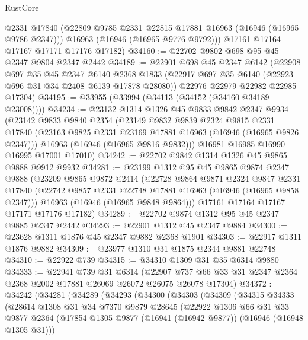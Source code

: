 \begin{lexlean}{RustCore}
\begin{coremodule}
        @2331
        @17840
        (@22809 @9785 @2331 @22815 @17881 @16963 (@16946 (@16965 @9786 @2347)))
        @16963
        (@16946 (@16965 @9776 @9792)))
      @17161
      @17164
      @17167
      @17171
      @17176
      @17182)
@34160 := @22702 @9802 @698 @95 @45 @2347 @9804 @2347 @2442
@34189 := @22901
    @698
    @45
    @2347
    @6142
    (@22908
      @697
      @35
      @45
      @2347
      @6140
      @2368
      @1833
      (@22917 @697 @35 @6140 (@22923 @696 @31 @34 @2408 @6139 @17878 @28080))
      @22976
      @22979
      @22982
      @22985
      @17304)
@34195 := @33955 (@33994 (@34113 (@34152 (@34160 @34189 @23008))))
@34234 := @23132
    @1314
    @1326
    @45
    @9833
    @9842
    @2347
    @9934
    (@23142
      @9833
      @9840
      @2354
      (@23149
        @9832
        @9839
        @2324
        @9815
        @2331
        @17840
        (@23163 @9825 @2331 @23169 @17881 @16963 (@16946 (@16965 @9826 @2347)))
        @16963
        (@16946 (@16965 @9816 @9832)))
      @16981
      @16985
      @16990
      @16995
      @17001
      @17010)
@34242 := @22702 @9842 @1314 @1326 @45 @9865 @9888 @9912 @9932
@34281 := @23199
    @1312
    @95
    @45
    @9865
    @9874
    @2347
    @9888
    (@23209
      @9865
      @9872
      @2414
      (@22728
        @9864
        @9871
        @2324
        @9847
        @2331
        @17840
        (@22742 @9857 @2331 @22748 @17881 @16963 (@16946 (@16965 @9858 @2347)))
        @16963
        (@16946 (@16965 @9848 @9864)))
      @17161
      @17164
      @17167
      @17171
      @17176
      @17182)
@34289 := @22702 @9874 @1312 @95 @45 @2347 @9885 @2347 @2442
@34293 := @22901 @1312 @45 @2347 @9884
@34300 := @23628 @1311 @1876 @45 @2347 @9882 @2368 @1901
@34303 := @22917 @1311 @1876 @9882
@34309 := @23977 @1310 @31 @1875 @2344 @9881 @22748
@34310 := @22922 @739
@34315 := @34310 @1309 @31 @35 @6314 @9880
@34333 := @22941
    @739
    @31
    @6314
    (@22907 @737 @66 @33 @31 @2347 @2364 @2368 @2002 @17881 @26069 @26072 @26075 @26078 @17304)
@34372 := @34242
    (@34281
      (@34289
        (@34293
          (@34300
            (@34303
              (@34309
                (@34315
                  @34333
                  (@28614
                    @1308
                    @31
                    @34
                    @7370
                    @9879
                    @28645
                    (@22922
                      @1306
                      @66
                      @31
                      @33
                      @9877
                      @2364
                      (@17854 @1305 @9877 (@16941 (@16942 @9877)) (@16946 (@16948 @1305 @31)))

\end{coremodule}
\end{lexlean}
